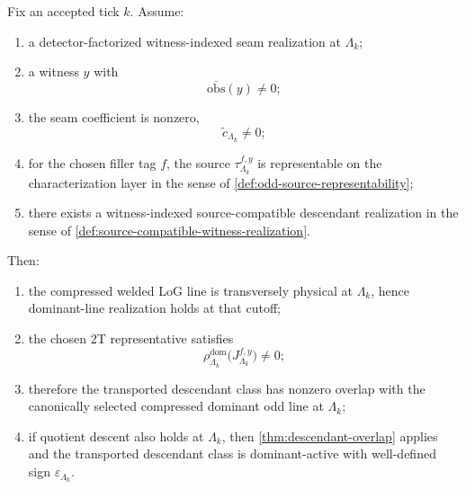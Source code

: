 \documentclass[11pt]{article}
\begin{document}
\begin{theorem}
\label{thm:fixed-cutoff-seam-witness}
Fix an accepted tick \(k\).
Assume:
\begin{enumerate}[leftmargin=2em]
\item a detector-factorized witness-indexed seam realization at \(\Lambda_k\);
\item a witness \(y\) with
  \[
  \overline{\mathrm{obs}}(y)\neq 0;
  \]
\item the seam coefficient is nonzero,
  \[
  \widetilde c_{\Lambda_k}\neq 0;
  \]
\item for the chosen filler tag \(f\), the source \(\tau^{f,y}_{\Lambda_k}\) is representable on the
  characterization layer in the sense of \cref{def:odd-source-representability};
\item there exists a witness-indexed source-compatible descendant realization in the sense of
  \cref{def:source-compatible-witness-realization}.
\end{enumerate}
Then:
\begin{enumerate}[leftmargin=2em]
\item the compressed welded LoG line is transversely physical at \(\Lambda_k\), hence dominant-line
  realization holds at that cutoff;
\item the chosen 2T representative satisfies
  \[
  \rho^{\mathrm{dom}}_{\Lambda_k}\!\big(J^{f,y}_{\Lambda_k}\big)\neq 0;
  \]
\item therefore the transported descendant class has nonzero overlap with the canonically selected
  compressed dominant odd line at \(\Lambda_k\);
\item if quotient descent also holds at \(\Lambda_k\), then
  \cref{thm:descendant-overlap} applies and the transported descendant class is dominant-active with
  well-defined sign \(\varepsilon_{\Lambda_k}\).
\end{enumerate}
\end{theorem}
\end{document}

